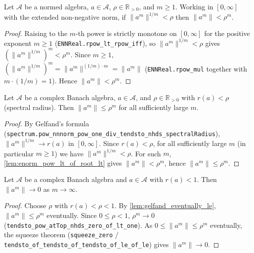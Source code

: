\begin{lemma}
    \label{lem:enorm_pow_lt_of_root_lt}
    \leanok
    Let $\mathcal{A}$ be a normed algebra, $a \in \mathcal{A}$, $\rho \in
    \mathbb{R}_{>0}$, and $m \ge 1$. Working in $[0,\infty]$ with the extended
    non-negative norm, if $\|a^{m}\|^{1/m} < \rho$ then $\|a^{m}\| < \rho^{m}$.
\end{lemma}
\begin{proof}
    Raising to the $m$-th power is strictly monotone on $[0,\infty]$ for the
    positive exponent $m \ge 1$ (\texttt{ENNReal.rpow\_lt\_rpow\_iff}), so
    $\|a^{m}\|^{1/m} < \rho$ gives $(\|a^{m}\|^{1/m})^{m} < \rho^{m}$. Since $m
    \ge 1$, $(\|a^{m}\|^{1/m})^{m} = \|a^{m}\|^{(1/m)\cdot m} = \|a^{m}\|$
    (\texttt{ENNReal.rpow\_mul} together with $m \cdot (1/m) = 1$). Hence
    $\|a^{m}\| < \rho^{m}$.
\end{proof}

\begin{lemma}
    \label{lem:gelfand_eventually_le}
    \leanok
    Let $\mathcal{A}$ be a complex Banach algebra, $a \in \mathcal{A}$, and
    $\rho \in \mathbb{R}_{>0}$ with $r(a) < \rho$ (spectral radius). Then
    $\|a^{m}\| \le \rho^{m}$ for all sufficiently large $m$.
\end{lemma}
\begin{proof}
    By Gelfand's formula
    (\texttt{spectrum.pow\_nnnorm\_pow\_one\_div\_tendsto\_nhds\_spectralRadius}),
    $\|a^{m}\|^{1/m} \to r(a)$ in $[0,\infty]$. Since $r(a) < \rho$, for all
    sufficiently large $m$ (in particular $m \ge 1$) we have $\|a^{m}\|^{1/m} <
    \rho$. For such $m$, \cref{lem:enorm_pow_lt_of_root_lt} gives $\|a^{m}\| <
    \rho^{m}$, hence $\|a^{m}\| \le \rho^{m}$.
\end{proof}

\begin{lemma}
    \label{lem:tendsto_pow_norm_lt_one}
    \leanok
    Let $\mathcal{A}$ be a complex Banach algebra and $a \in \mathcal{A}$ with
    $r(a) < 1$. Then $\|a^{m}\| \to 0$ as $m \to \infty$.
\end{lemma}
\begin{proof}
    Choose $\rho$ with $r(a) < \rho < 1$. By \cref{lem:gelfand_eventually_le},
    $\|a^{m}\| \le \rho^{m}$ eventually. Since $0 \le \rho < 1$, $\rho^{m} \to 0$
    (\texttt{tendsto\_pow\_atTop\_nhds\_zero\_of\_lt\_one}). As $0 \le \|a^{m}\|
    \le \rho^{m}$ eventually, the squeeze theorem
    (\texttt{squeeze\_zero} /
    \texttt{tendsto\_of\_tendsto\_of\_tendsto\_of\_le\_of\_le}) gives
    $\|a^{m}\| \to 0$.
\end{proof}

